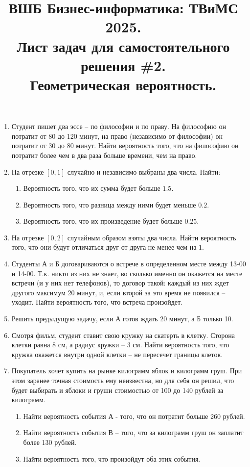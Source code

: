 \documentclass{article}
\title{ВШБ Бизнес-информатика: ТВиМС 2025. \\ Лист задач для самостоятельного решения \#2. \\ Геометрическая вероятность.}
\date{}
\author{}
\begin{document}
\maketitle

\begin{enumerate}
    \item Студент пишет два эссе – по философии и по праву.
    На философию он потратит от 80 до 120 минут, на право (независимо от философии) он потратит от 30 до 80 минут.
    Найти вероятность того, что на философию он потратит более чем в два раза больше времени, чем на право.

    \item На отрезке $[0,1]$ случайно и независимо выбраны два числа. Найти:
    \begin{enumerate}
        \item Вероятность того, что их сумма будет больше $1.5$.
        \item Вероятность того, что разница между ними будет меньше $0.2$.
        \item Вероятность того, что их произведение будет больше $0.25$.
    \end{enumerate}

    \item На отрезке $[0,2]$ случайным образом взяты два числа.
    Найти вероятность того, что они будут отличаться друг от друга не менее чем на $1$.

    \item Студенты А и Б договариваются о встрече в определенном месте между 13-00 и 14-00.
    Т.к. никто из них не знает, во сколько именно он окажется на месте встречи (и у них нет телефонов), то договор такой:
    каждый из них ждет другого максимум 20 минут, и, если второй за это время не появился – уходит.
    Найти вероятность того, что встреча произойдет.

    \item Решить предыдущую задачу, если А готов ждать 20 минут, а Б только 10.
    
    \item Смотря фильм, студент ставит свою кружку на скатерть в клетку.
    Сторона клетки равна 8 см, а радиус кружки – 3 см.
    Найти вероятность того, что кружка окажется внутри одной клетки – не пересечет границы клеток.

    \item Покупатель хочет купить на рынке килограмм яблок и килограмм груш.
    При этом заранее точная стоимость ему неизвестна, но для себя он решил,
    что будет выбирать и яблоки и груши стоимостью от 100 до 140 рублей за килограмм.
    \begin{enumerate}
    \item Найти вероятность события А - того, что он потратит больше 260 рублей.
    \item Найти вероятность события В – того, что за килограмм груш он заплатит более 130 рублей.
    \item Найти вероятность того, что произойдут оба этих события.
    \end{enumerate}


\end{enumerate}
\end{document}
